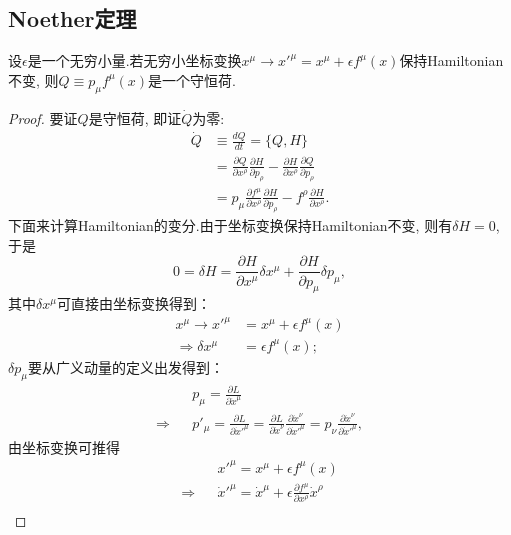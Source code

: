 	\subsection{Noether定理}
		\begin{theorem}
		设$\epsilon$是一个无穷小量.若无穷小坐标变换$x^\mu\rightarrow x'^\mu=x^\mu+\epsilon f^\mu(x)$保持Hamiltonian不变, 则$Q\equiv p_\mu f^\mu(x)$是一个守恒荷.
		\end{theorem}
		\begin{proof}
		要证$Q$是守恒荷, 即证$\dot{Q}$为零:
		\begin{equation*}
			\begin{split}
				\dot{Q}&\equiv\frac{dQ}{dt}=\{Q,H\}\\
				&=\frac{\partial Q}{\partial x^\rho}\frac{\partial H}{\partial p_\rho}-\frac{\partial H}{\partial x^\rho}\frac{\partial Q}{\partial p_\rho}\\
				&=p_\mu \frac{\partial f^\mu}{\partial x^\rho}\frac{\partial H}{\partial p_\rho}-f^\rho\frac{\partial H}{\partial x^\rho}.
			\end{split}
		\end{equation*}
		下面来计算Hamiltonian的变分.由于坐标变换保持Hamiltonian不变, 则有$\delta H=0$, 于是
		\begin{equation}\label{pr:delta H}
			0=\delta H=\frac{\partial H}{\partial x^\mu}\delta x^\mu+\frac{\partial H}{\partial p_\mu}\delta p_\mu,
		\end{equation}
		其中$\delta x^\mu$可直接由坐标变换得到：
		\begin{equation}\label{pr:delta x}
			\begin{split}
				x^\mu\rightarrow x'^\mu&=x^\mu+\epsilon f^\mu(x)\\
				\Rightarrow\delta x^\mu&=\epsilon f^\mu(x);
			\end{split}
		\end{equation}
		$\delta p_\mu$要从广义动量的定义出发得到：
		\begin{eqnarray*}
			&&p_\mu=\frac{\partial L}{\partial \dot{x}^\mu}\\
			\Rightarrow &&p'_\mu=\frac{\partial L}{\partial \dot{x}'^\mu}=\frac{\partial L}{\partial \dot{x}^\nu}\frac{\partial \dot{x}^\nu}{\partial \dot{x}'^\mu}=p_\nu\frac{\partial \dot{x}^\nu}{\partial \dot{x}'^\mu},
		\end{eqnarray*}
		由坐标变换可推得
		\begin{eqnarray*}
			&&x'^\mu=x^\mu+\epsilon f^\mu(x)\\
			\Rightarrow&&\dot{x}'^\mu=\dot{x}^\mu+\epsilon \frac{\partial f^\mu}{\partial x^\rho}\dot{x}^\rho\\

\end{eqnarray*}
\end{proof}
